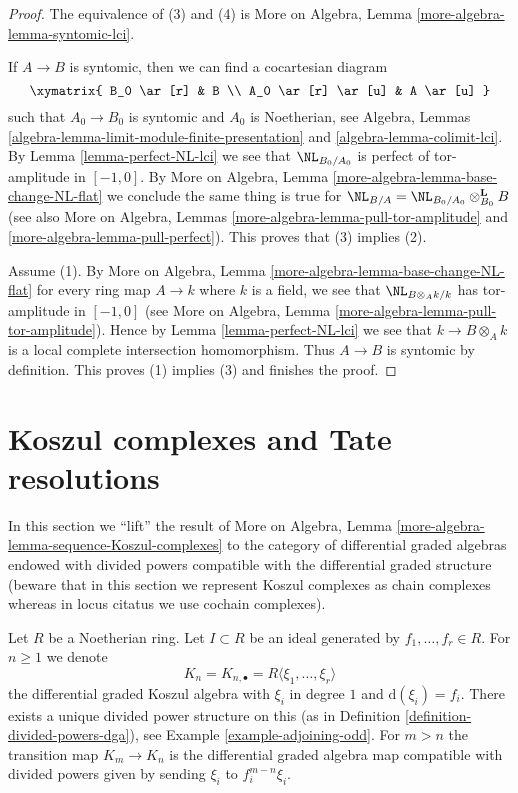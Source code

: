 \begin{proof}
The equivalence of (3) and (4) is More on Algebra, Lemma
\ref{more-algebra-lemma-syntomic-lci}.

\medskip\noindent
If $A \to B$ is syntomic, then we can find a cocartesian diagram
$$
\xymatrix{
B_0 \ar[r] & B \\
A_0 \ar[r] \ar[u] & A \ar[u]
}
$$
such that $A_0 \to B_0$ is syntomic and $A_0$ is Noetherian, see
Algebra, Lemmas \ref{algebra-lemma-limit-module-finite-presentation} and
\ref{algebra-lemma-colimit-lci}. By Lemma \ref{lemma-perfect-NL-lci}
we see that $\NL_{B_0/A_0}$ is perfect of tor-amplitude in $[-1, 0]$.
By More on Algebra, Lemma \ref{more-algebra-lemma-base-change-NL-flat}
we conclude the same thing is true for
$\NL_{B/A} = \NL_{B_0/A_0} \otimes_{B_0}^\mathbf{L} B$ (see
also More on Algebra, Lemmas \ref{more-algebra-lemma-pull-tor-amplitude} and
\ref{more-algebra-lemma-pull-perfect}).
This proves that (3) implies (2).

\medskip\noindent
Assume (1). By More on Algebra, Lemma
\ref{more-algebra-lemma-base-change-NL-flat}
for every ring map $A \to k$ where
$k$ is a field, we see that $\NL_{B \otimes_A k/k}$ has
tor-amplitude in $[-1, 0]$ (see
More on Algebra, Lemma \ref{more-algebra-lemma-pull-tor-amplitude}).
Hence by Lemma \ref{lemma-perfect-NL-lci} we see that $k \to B \otimes_A k$ is
a local complete intersection homomorphism. Thus $A \to B$
is syntomic by definition. This proves (1) implies (3)
and finishes the proof.
\end{proof}





\section{Koszul complexes and Tate resolutions}
\label{section-koszul-vs-tate}

\noindent
In this section we ``lift'' the result of
More on Algebra, Lemma \ref{more-algebra-lemma-sequence-Koszul-complexes}
to the category of differential graded algebras endowed with divided
powers compatible with the differential graded structure (beware
that in this section we represent Koszul complexes as chain complexes
whereas in locus citatus we use cochain complexes).

\medskip\noindent
Let $R$ be a Noetherian ring. Let $I \subset R$ be an ideal generated
by $f_1, \ldots, f_r \in R$. For $n \geq 1$ we denote
$$
K_n = K_{n, \bullet} = R\langle \xi_1, \ldots, \xi_r\rangle
$$
the differential graded Koszul algebra with $\xi_i$ in degree $1$ and
$\text{d}(\xi_i) = f_i$. There exists a unique divided power structure on this
(as in Definition \ref{definition-divided-powers-dga}), see
Example \ref{example-adjoining-odd}. For $m > n$ the transition map
$K_m \to K_n$ is the differential graded algebra map compatible with
divided powers given by sending $\xi_i$ to $f_i^{m - n}\xi_i$.

